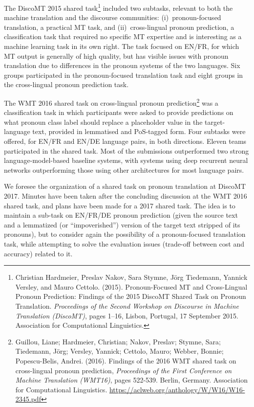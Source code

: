 \documentclass[11pt]{article}
\begin{document}
The DiscoMT 2015 shared task\footnote{Christian Hardmeier, Preslav Nakov, Sara Stymne, Jörg Tiedemann, Yannick Versley, and Mauro Cettolo. (2015). Pronoun-Focused MT and Cross-Lingual Pronoun Prediction: Findings of the 2015 DiscoMT Shared Task on Pronoun Translation.  \textit{Proceedings of the Second Workshop on Discourse in Machine Translation (DiscoMT)}, pages 1–16, Lisbon, Portugal, 17 September 2015.  Association for Computational Linguistics.}
included two subtasks, relevant to both the machine translation and the discourse communities: (i)~pronoun-focused translation, a practical
MT task, and (ii)~cross-lingual pronoun prediction, a classification task that required no specific MT expertise and is interesting as a machine learning task in its own right. The task focused on EN/FR, for which MT output is generally of high quality, but has visible issues with pronoun translation due
to differences in the pronoun systems of the two languages. Six groups participated in the pronoun-focused translation task and eight groups in the cross-lingual pronoun prediction task.

The WMT 2016 shared task on cross-lingual pronoun prediction\footnote{Guillou, Liane; Hardmeier, Christian; Nakov, Preslav; Stymne, Sara; Tiedemann, Jörg; Versley, Yannick; Cettolo, Mauro; Webber, Bonnie; Popescu-Belis, Andrei. (2016).  Findings of the 2016 WMT shared task on cross-lingual pronoun prediction, \textit{Proceedings of the First Conference on Machine Translation (WMT16)}, pages 522-539.  Berlin, Germany. Association for Computational Linguistics. \url{https://aclweb.org/anthology/W/W16/W16-2345.pdf}}
was a  classification  task  in which  participants  were  asked  to  provide predictions  on  what  pronoun  class  label should replace a placeholder value in the target-language  text,  provided  in  lemmatised and PoS-tagged form.  Four subtasks were offered, for EN/FR and EN/DE language  pairs,  in  both directions.   Eleven  teams  participated  in the  shared  task. Most of the submissions outperformed two strong language-model-based baseline systems, with systems using deep recurrent neural networks outperforming those using other architectures for most language pairs.

We foresee the organization of a shared task on pronoun translation at DiscoMT 2017.  Minutes have been taken after the concluding discussion at the WMT 2016 shared task, and plans have been made for a 2017 shared task.  The idea is to maintain a sub-task on EN/FR/DE pronoun prediction (given the source text and a lemmatized (or ``impoverished'') version of the target text stripped of its pronouns), but to consider again the possibility of a pronoun-focused translation task, while attempting to solve the evaluation issues (trade-off between cost and accuracy) related to it.
\end{document}
